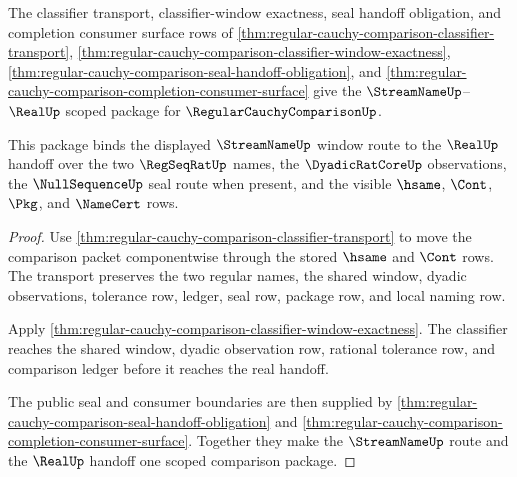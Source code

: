\begin{theorem}
\label{thm:regular-cauchy-comparison-streamname-realup-scope-package}
The classifier transport, classifier-window exactness, seal handoff obligation, and completion consumer surface rows of \autoref{thm:regular-cauchy-comparison-classifier-transport}, \autoref{thm:regular-cauchy-comparison-classifier-window-exactness}, \autoref{thm:regular-cauchy-comparison-seal-handoff-obligation}, and \autoref{thm:regular-cauchy-comparison-completion-consumer-surface} give the $\StreamNameUp$--$\RealUp$ scoped package for $\RegularCauchyComparisonUp$.

This package binds the displayed $\StreamNameUp$ window route to the $\RealUp$ handoff over the two $\RegSeqRatUp$ names, the $\DyadicRatCoreUp$ observations, the $\NullSequenceUp$ seal route when present, and the visible $\hsame$, $\Cont$, $\Pkg$, and $\NameCert$ rows.
\end{theorem}
\begin{proof}
Use \autoref{thm:regular-cauchy-comparison-classifier-transport} to move the comparison packet componentwise through the stored $\hsame$ and $\Cont$ rows. The transport preserves the two regular names, the shared window, dyadic observations, tolerance row, ledger, seal row, package row, and local naming row.

Apply \autoref{thm:regular-cauchy-comparison-classifier-window-exactness}. The classifier reaches the shared window, dyadic observation row, rational tolerance row, and comparison ledger before it reaches the real handoff.

The public seal and consumer boundaries are then supplied by \autoref{thm:regular-cauchy-comparison-seal-handoff-obligation} and \autoref{thm:regular-cauchy-comparison-completion-consumer-surface}. Together they make the $\StreamNameUp$ route and the $\RealUp$ handoff one scoped comparison package.
\end{proof}

